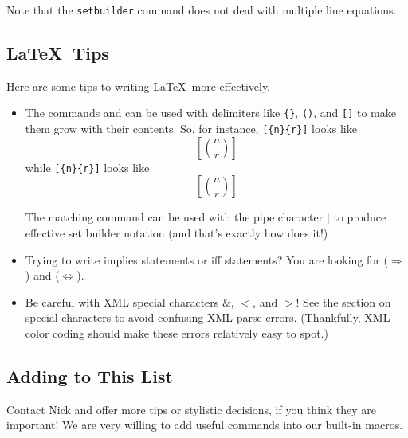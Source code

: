 {    Note that the \texttt{setbuilder} command does not deal with multiple 
    line equations.
  
  \subsection{\LaTeX\ Tips}
    Here are some tips to writing \LaTeX\ more effectively. 
    \begin{itemize}
      \item The commands  and  can be used with delimiters like \texttt{\{\}}, \texttt{()}, and \texttt{[]} to make them grow with their contents. So, for instance, \texttt{[\{n\}\{r\}]} looks like \[[\binom nr]\] while \texttt{[\{n\}\{r\}]} looks like \[\left[\binom nr\right]\]
      
      The matching command  can be used with the pipe character $|$ to produce effective set builder notation (and that's exactly how  does it!)
      \item Trying to write implies statements or iff statements? You are looking for  ($\Rightarrow$) and  ($\Leftrightarrow$).
      \item Be careful with XML special characters \&, $<$, and $>$! See the section on special characters to avoid confusing XML parse errors. (Thankfully, XML color coding should make these errors relatively easy to spot.)
    \end{itemize}
    
  \subsection{Adding to This List}
    Contact Nick and offer more tips or stylistic decisions, if you think 
    they are important! We are very willing to add useful commands into our 
    built-in macros.
  
  
}
  
  
  